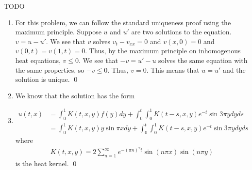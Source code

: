 \documentclass{article}
\begin{document}
\newpage
{} TODO \tri
\hop
\solution
\begin{enumerate}
    \item For this problem, we can follow the standard uniqueness proof using the maximum principle. Suppose $u$ and $u'$ are two solutions to the equation. $v = u - u'$. We see that $v$ solves $v_t - v_{xx} = 0$ and $v(x,0) = 0$ and $v(0,t) = v(1,t) = 0$. Thus, by the maximum principle on inhomogenous heat equations, $v \le 0$. We see that $-v = u' - u$ solves the same equation with the same properties, so $-v \le 0$. Thus, $v= 0$. This means that $ u = u'$ and the solution is unique. \qed
    \item  We know that the solution has the form 
    \item \begin{align*}
        u(t,x) &= \int_0^1K(t,x,y)f(y)dy + \int_0^t\int_0^1 K(t-s,x,y)e^{-t}\sin 3\pi y dy ds \\
        &= \int_0^1K(t,x,y)y\sin \pi x dy + \int_0^t\int_0^1 K(t-s,x,y)e^{-t}\sin 3\pi y dy ds
    \end{align*}
    where 
    \begin{align*}
        K(t,x,y) = 2 \sum_{n=1}^\infty e^{-(\pi n)^2 t}\sin(n \pi x) \sin(n \pi y)
    \end{align*}
    is the heat kernel. \qed
\end{enumerate}
\end{document}
